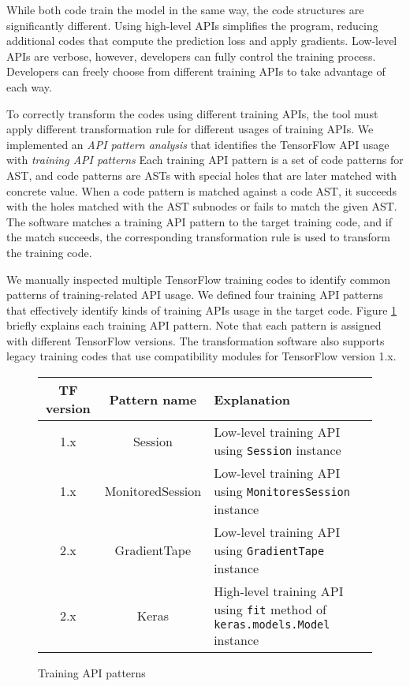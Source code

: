 While both code train the model in the same way, 
the code structures are significantly different.
Using high-level APIs simplifies the program,
reducing additional codes that compute the prediction loss and apply gradients.
Low-level APIs are verbose, however, developers can fully control
the training process.
Developers can freely choose from different training APIs to
take advantage of each way.

To correctly transform the codes using different training APIs, 
the tool must apply different transformation rule for different usages
of training APIs.
We implemented an \textit{API pattern analysis} that identifies
the TensorFlow API usage with \textit{training API patterns} 
Each training API pattern is a set of code patterns for AST,
and code patterns are ASTs with
special holes that are later matched with concrete value.
When a code pattern is matched against a code AST,
it succeeds with the holes matched with the AST subnodes
or fails to match the given AST.
The software matches a training API pattern to the target training code,
and if the match succeeds, the corresponding transformation rule
is used to transform the training code.

We manually inspected multiple TensorFlow training codes to identify
common patterns of training-related API usage. 
We defined four training API patterns
that effectively identify kinds of training APIs usage in the target code.
Figure \ref{tab:patterns} briefly explains each training API pattern.
Note that each pattern is assigned with different TensorFlow versions.
The transformation software also supports legacy training codes
that use compatibility modules for TensorFlow version 1.x.

\begin{figure}
  \centering
  \begin{tabular}{|c|c|l|}
    \hline
    TF version & Pattern name & Explanation \\
    \hline
    1.x & Session & Low-level training API using {\tt Session} instance\\
    \hline
    1.x & MonitoredSession & Low-level training API using {\tt MonitoresSession} instance \\
    \hline
    2.x & GradientTape & Low-level training API using {\tt GradientTape} instance\\
    \hline
    2.x & Keras & High-level training API using {\tt fit} method of {\tt keras.models.Model} instance\\
    \hline
  \end{tabular}
  \caption{Training API patterns}
  \label{tab:patterns}
\end{figure}

